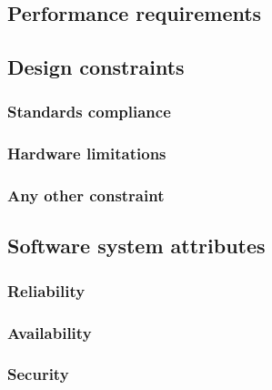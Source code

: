 \documentclass[12pt]{article}
\begin{document}





  \subsection{Performance requirements}
  \subsection{Design constraints}
    \subsubsection{Standards compliance}
    \subsubsection{Hardware limitations}
    \subsubsection{Any other constraint}
  \subsection{Software system attributes}
    \subsubsection{Reliability}
    \subsubsection{Availability}
    \subsubsection{Security}
\end{document}
